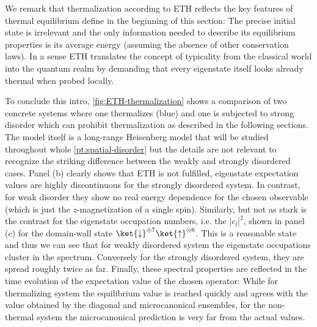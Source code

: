 We remark that thermalization according to ETH reflects the key features of thermal equilibrium define in the beginning of this section: The precise initial state is irrelevant and the only information needed to describe its equilibrium properties is its average energy (assuming the absence of other conservation laws). In a sense ETH translates the concept of typicality from the classical world into the quantum realm by demanding that every eigenstate itself looks already thermal when probed locally. 

To conclude this intro, \autoref{fig:ETH-thermalization} shows a comparison of two concrete systems where one thermalizes (blue) and one is subjected to strong disorder which can prohibit thermalization as described in the following sections. The model itself is a long-range Heisenberg model that will be studied throughout whole \autoref{pt:spatial-disorder} but the details are not relevant to recognize the striking difference between the weakly and strongly disordered cases. Panel (b) clearly shows that ETH is not fulfilled, eigenstate expectation values are highly discontinuous for the strongly disordered system. In contrast, for weak disorder they show no real energy dependence for the chosen observable (which is just the $z$-magnetization of a single spin). Similarly, but not as stark is the contrast for the eigenstate occupation numbers, i.e. the $|c_l|^2$, shown in panel (c) for the domain-wall state $\ket{\downarrow}^{\otimes 7}\ket{\uparrow}^{\otimes 6}$. This is a reasonable state and thus we can see that for weakly disordered system the eigenstate occupations cluster in the spectrum. Conversely for the strongly disordered system, they are spread roughly twice as far. Finally, these spectral properties are reflected in the time evolution of the expectation value of the chosen operator: While for thermalizing system the equilibrium value is reached quickly and agrees with the value obtained by the diagonal and microcanonical ensembles, for the non-thermal system the microcanonical prediction is very far from the actual values.


%
%

